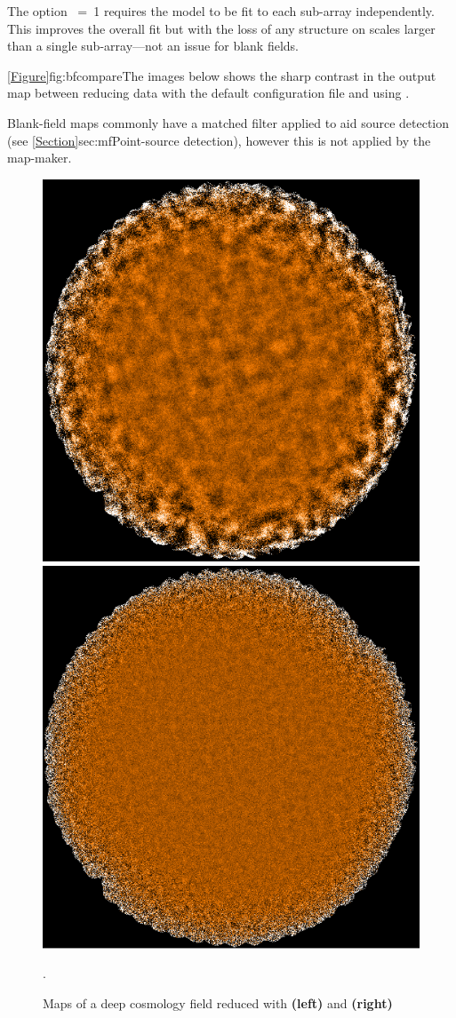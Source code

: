 The option ~=~1 requires the  model to
be fit to each sub-array independently. This improves the overall fit
but with the loss of any structure on scales larger than a single
sub-array---not an issue for blank fields.

\cref{Figure}{fig:bfcompare}{The images below} shows the sharp
contrast in the output map between reducing data with the default
configuration file and using .

Blank-field maps commonly have a matched filter applied to aid source
detection (see \cref{Section}{sec:mf}{Point-source detection}),
however this is not applied by the map-maker.

\begin{figure}[t!]
\includegraphics[width=0.47\linewidth]{sc21_cosmo1-def}
\hspace{3mm}
\includegraphics[width=0.47\linewidth]{sc21_cosmo1-bf}
\caption[Example map reduced with ]{
    Maps of a deep cosmology field reduced with \textbf{(left)}
     and \textbf{(right)}
     \label{fig:bfcompare}}.
\end{figure}



